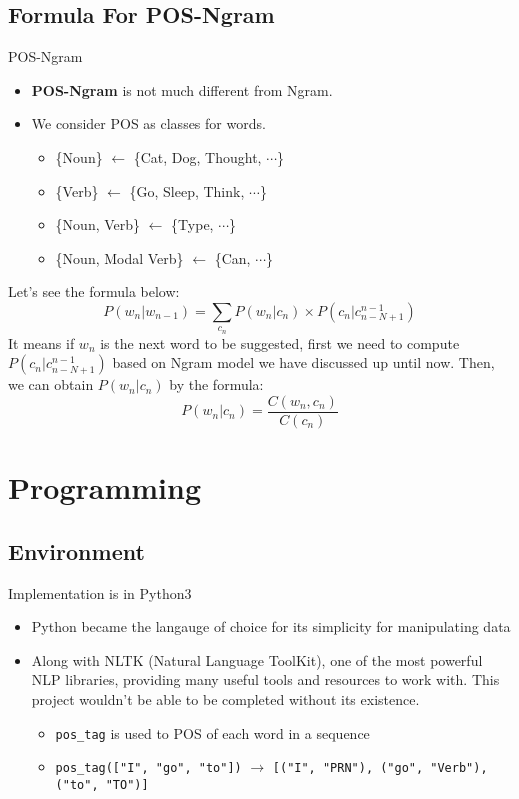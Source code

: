 \documentclass{beamer}
\begin{document}
\subsection{Formula For POS-Ngram}
\begin{frame}{POS-Ngram}
    \begin{itemize}
        \item \textbf{POS-Ngram} is not much different from Ngram.\\
        \item We consider POS as classes for words.
            \begin{itemize}
                \item \{Noun\} $\leftarrow$ \{Cat, Dog, Thought, $\cdots$\}
                \item \{Verb\} $\leftarrow$ \{Go, Sleep, Think, $\cdots$\}
                \item \{Noun, Verb\} $\leftarrow$ \{Type, $\cdots$\}
                \item \{Noun, Modal Verb\} $\leftarrow$ \{Can, $\cdots$\}
            \end{itemize}
    \end{itemize}
    Let's see the formula below:
    $$P(w_n|w_{n-1}) = \sum_{c_n}P(w_n|c_n)\times P(c_n|c_{n-N+1}^{n-1})$$
    It means if $w_n$ is the next word to be suggested, first we need to compute $P(c_n|c_{n-N+1}^{n-1})$ based on Ngram model we have discussed up until now. Then, we can obtain $P(w_n|c_n)$ by the formula:
    $$P(w_n|c_n) = \frac{C(w_n,c_n)}{C(c_n)}$$

\end{frame}
\section{Programming}
\subsection{Environment}

\begin{frame}{Implementation is in Python3}
    \begin{itemize}
        \item Python became the langauge of choice for its simplicity for manipulating data
        \item Along with NLTK (Natural Language ToolKit), one of the most powerful NLP libraries, providing many useful tools and resources to work with. This project wouldn't be able to be completed without its existence.
            \begin{itemize}
                \item \lstinline{pos_tag} is used to POS of each word in a sequence
                \item \lstinline{pos_tag(["I", "go", "to"])} $\rightarrow$ \lstinline{[("I", "PRN"), ("go", "Verb"), ("to", "TO")]}
            \end{itemize}
    \end{itemize}
\end{frame}
\end{document}
